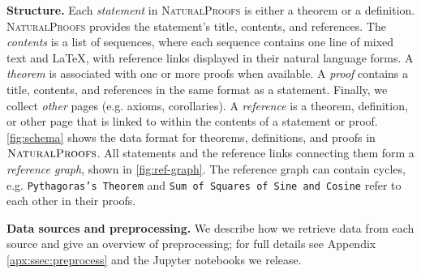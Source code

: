 \textbf{Structure.}
Each \textit{statement} in \textsc{NaturalProofs} 
is either a theorem or a definition.
\textsc{NaturalProofs} provides the statement's title, contents, and references.
The \textit{contents} is a list of sequences, where each sequence contains one line of mixed text and \LaTeX{}, with reference links displayed in their natural language forms.
A \textit{theorem} is associated with one or more proofs when available.
A \textit{proof} contains a title, contents, and references in the same format as a statement.
Finally, we collect \textit{other} pages (e.g. axioms, corollaries).
A \textit{reference} is a theorem, definition, or other page that is linked to within the contents of a statement or proof.
\autoref{fig:schema} shows the data format for theorems, definitions, and proofs in $\textsc{NaturalProofs}$.
All statements and the reference links connecting them form a \textit{reference graph}, shown in \autoref{fig:ref-graph}.
The reference graph can contain cycles, e.g. \texttt{Pythagoras's Theorem} and \texttt{Sum of Squares of Sine and Cosine} refer to each other in their proofs.

\textbf{Data sources and preprocessing.}
We describe how we retrieve data from each source and give an overview of preprocessing; for full details see Appendix \ref{apx:ssec:preprocess} and the Jupyter notebooks we release.

